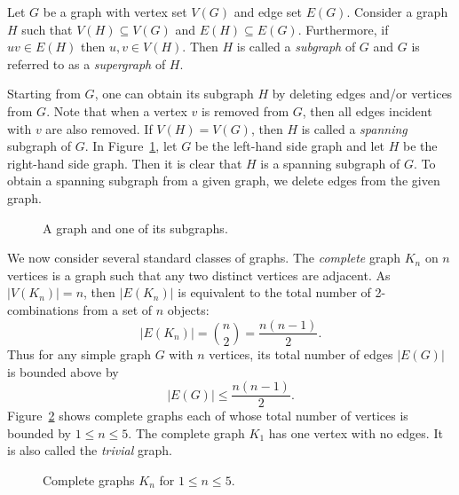 Let $G$ be a graph with vertex set $V(G)$ and edge set
$E(G)$. Consider a graph $H$ such that $V(H) \subseteq V(G)$ and $E(H)
\subseteq E(G)$. Furthermore, if $uv \in E(H)$ then $u,v \in
V(H)$. Then $H$ is called a \emph{subgraph} of $G$ and $G$ is referred
to as a \emph{supergraph} of $H$.

Starting from $G$, one can obtain its subgraph $H$ by deleting edges
and/or vertices from $G$. Note that when a vertex $v$ is removed from
$G$, then all edges incident with $v$ are also removed. If $V(H) =
V(G)$, then $H$ is called a \emph{spanning} subgraph of $G$. In
Figure~\ref{fig:introduction:star_subgraph}, let $G$ be the left-hand
side graph and let $H$ be the right-hand side graph. Then it is clear
that $H$ is a spanning subgraph of $G$. To obtain a spanning subgraph
from a given graph, we delete edges from the given graph.

\begin{figure}[!htbp]
\centering

\caption{A graph and one of its subgraphs.}
\label{fig:introduction:star_subgraph}
\end{figure}

We now consider several standard classes of graphs. The \emph{complete}
graph $K_n$ on $n$ vertices is a graph such that any two distinct
vertices are adjacent. As $|V(K_n)| = n$, then $|E(K_n)|$ is
equivalent to the total number of 2-combinations from a set of $n$
objects:
%
\begin{equation}
\label{eq:introduction:size_of_K_n}
|E(K_n)|
=
\binom{n}{2}
=
\frac{n(n-1)}{2}.
\end{equation}
%
Thus for any simple graph $G$ with $n$ vertices, its total number of
edges $|E(G)|$ is bounded above by
%
\begin{equation}
\label{eq:introduction:upper_bound_total_edges_simple_graph}
|E(G)|
\leq
\frac{n(n - 1)}{2}.
\end{equation}
%
Figure~\ref{fig:introduction:five_complete_graphs} shows complete
graphs each of whose total number of vertices is bounded by
$1 \leq n \leq 5$. The complete graph $K_1$ has one vertex with
no edges. It is also called the \emph{trivial} graph.

\begin{figure}[!htbp]
\centering

\caption{Complete graphs $K_n$ for $1 \leq n \leq 5$.}
\label{fig:introduction:five_complete_graphs}
\end{figure}

